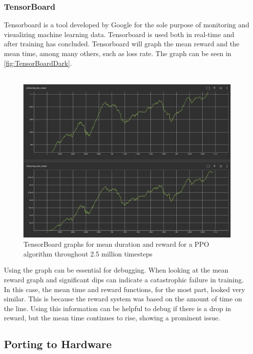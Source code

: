\documentclass[a4paper,12pt]{article}
\begin{document}
\subsubsection{TensorBoard}

Tensorboard is a tool developed by Google for the sole purpose of monitoring and visualizing machine learning data. Tensorboard is used both in real-time and after training has concluded. Tensorboard will graph the mean reward and the mean time, among many others, such as loss rate. The graph can be seen in \autoref{fig:TensorBoardDark}.
\\\\
\begin{figure}[H]
\centering
\includegraphics[width=15cm]{./imgs/TensorBoardDark.png}
\caption{TensorBoard graphs for mean duration and reward for a PPO algorithm throughout 2.5 million timesteps}
\label{fig:TensorBoardDark}
\end{figure}
Using the graph can be essential for debugging. When looking at the mean reward graph and significant dips can indicate a catastrophic failure in training. In this case, the mean time and reward functions, for the most part, looked very similar. This is because the reward system was based on the amount of time on the line. Using this information can be helpful to debug if there is a drop in reward, but the mean time continues to rise, showing a prominent issue.

\subsection{Porting to Hardware}
\end{document}
